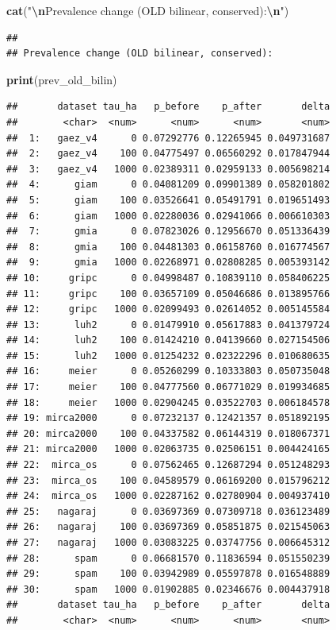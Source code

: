 \documentclass[
  11pt,
]{article}
\newenvironment{Shaded}{\begin{snugshade}}{\end{snugshade}}
\newcommand{\FunctionTok}[1]{\textcolor[rgb]{0.13,0.29,0.53}{\textbf{#1}}}
\newcommand{\NormalTok}[1]{#1}
\newcommand{\SpecialCharTok}[1]{\textcolor[rgb]{0.81,0.36,0.00}{\textbf{#1}}}
\newcommand{\StringTok}[1]{\textcolor[rgb]{0.31,0.60,0.02}{#1}}
\begin{document}
\begin{Shaded}
\begin{Highlighting}[]
\FunctionTok{cat}\NormalTok{(}\StringTok{"}\SpecialCharTok{\textbackslash{}n}\StringTok{Prevalence change (OLD bilinear, conserved):}\SpecialCharTok{\textbackslash{}n}\StringTok{"}\NormalTok{)}
\end{Highlighting}
\end{Shaded}

\begin{verbatim}
## 
## Prevalence change (OLD bilinear, conserved):
\end{verbatim}

\begin{Shaded}
\begin{Highlighting}[]
\FunctionTok{print}\NormalTok{(prev\_old\_bilin)}
\end{Highlighting}
\end{Shaded}

\begin{verbatim}
##       dataset tau_ha   p_before    p_after       delta
##        <char>  <num>      <num>      <num>       <num>
##  1:   gaez_v4      0 0.07292776 0.12265945 0.049731687
##  2:   gaez_v4    100 0.04775497 0.06560292 0.017847944
##  3:   gaez_v4   1000 0.02389311 0.02959133 0.005698214
##  4:      giam      0 0.04081209 0.09901389 0.058201802
##  5:      giam    100 0.03526641 0.05491791 0.019651493
##  6:      giam   1000 0.02280036 0.02941066 0.006610303
##  7:      gmia      0 0.07823026 0.12956670 0.051336439
##  8:      gmia    100 0.04481303 0.06158760 0.016774567
##  9:      gmia   1000 0.02268971 0.02808285 0.005393142
## 10:     gripc      0 0.04998487 0.10839110 0.058406225
## 11:     gripc    100 0.03657109 0.05046686 0.013895766
## 12:     gripc   1000 0.02099493 0.02614052 0.005145584
## 13:      luh2      0 0.01479910 0.05617883 0.041379724
## 14:      luh2    100 0.01424210 0.04139660 0.027154506
## 15:      luh2   1000 0.01254232 0.02322296 0.010680635
## 16:     meier      0 0.05260299 0.10333803 0.050735048
## 17:     meier    100 0.04777560 0.06771029 0.019934685
## 18:     meier   1000 0.02904245 0.03522703 0.006184578
## 19: mirca2000      0 0.07232137 0.12421357 0.051892195
## 20: mirca2000    100 0.04337582 0.06144319 0.018067371
## 21: mirca2000   1000 0.02063735 0.02506151 0.004424165
## 22:  mirca_os      0 0.07562465 0.12687294 0.051248293
## 23:  mirca_os    100 0.04589579 0.06169200 0.015796212
## 24:  mirca_os   1000 0.02287162 0.02780904 0.004937410
## 25:   nagaraj      0 0.03697369 0.07309718 0.036123489
## 26:   nagaraj    100 0.03697369 0.05851875 0.021545063
## 27:   nagaraj   1000 0.03083225 0.03747756 0.006645312
## 28:      spam      0 0.06681570 0.11836594 0.051550239
## 29:      spam    100 0.03942989 0.05597878 0.016548889
## 30:      spam   1000 0.01902885 0.02346676 0.004437918
##       dataset tau_ha   p_before    p_after       delta
##        <char>  <num>      <num>      <num>       <num>
\end{verbatim}
\end{document}
